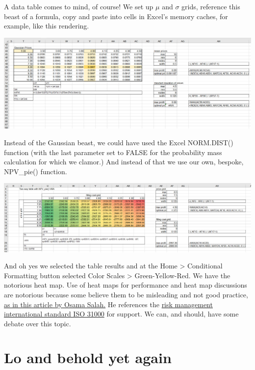 \documentclass[
]{book}
\begin{document}
A data table comes to mind, of course! We set up \(\mu\) and \(\sigma\) grids, reference this beast of a formula, copy and paste into cells in Excel's memory caches, for example, like this rendering.

\includegraphics{images/02/pie-gauss-mu-sigma-table.jpg}

Instead of the Gaussian beast, we could have used the Excel NORM.DIST() function (with the last parameter set to FALSE for the probability mass calculation for which we clamor.) And instead of that we use our own, bespoke, NPV\_pie() function.

\includegraphics{images/02/pie-sensitivity-npv_pie.jpg}

And oh yes we selected the table results and at the Home \textgreater{} Conditional Formatting button selected Color Scales \textgreater{} Green-Yellow-Red. We have the notorious heat map. Use of heat maps for performance and heat map discussions are notorious because some believe them to be misleading and not good practice, \href{https://www.fairinstitute.org/blog/heat-maps-dont-support-iso-31000}{as in this article by Osama Salah.} He references the \href{https://www.iso.org/iso-31000-risk-management.html}{risk management international standard ISO 31000} for support. We can, and should, have some debate over this topic.

\hypertarget{lo-and-behold-yet-again}{%
\section{Lo and behold yet again}\label{lo-and-behold-yet-again}}
\end{document}
